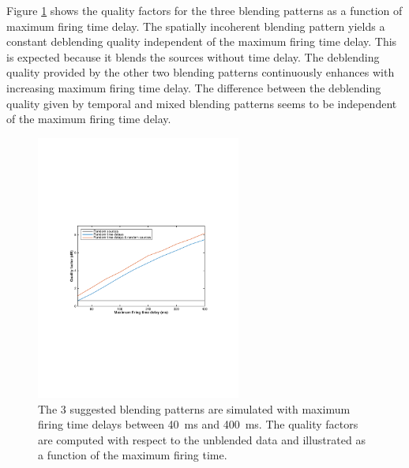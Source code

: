 Figure \ref{fig:Ch-Results-QualityFactors} shows the quality factors for the three blending patterns as a function of maximum firing time delay. The spatially incoherent blending pattern yields a constant deblending quality independent of the maximum firing time delay. This is expected because it blends the sources without time delay. The deblending quality provided by the other two blending patterns continuously enhances with increasing maximum firing time delay. The difference between the deblending quality given by temporal and mixed blending patterns seems to be independent of the maximum firing time delay.

\begin{figure}
	\centering
	\includegraphics[width = 0.6\textwidth]{Plots/BlendingPatterns/quality_line_plot_avg}
	\caption{The 3 suggested blending patterns are simulated with maximum firing time delays between \SI{40}{\milli\second} and \SI{400}{\milli\second}. The quality factors are computed with respect to the unblended data and illustrated as a function of the maximum firing time.}
	\label{fig:Ch-Results-QualityFactors}
\end{figure}

				

